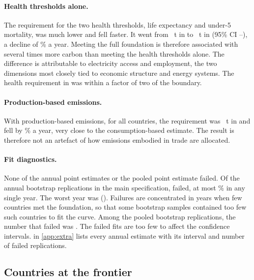 \paragraph{Health thresholds alone.} The requirement for the two health thresholds, life expectancy and under-5 mortality, was much lower and fell faster. It went from \nReqHealthStart~t in \nShareYearStart{} to \nReqHealthEnd~t in \nLastYear{} (95\% CI \nReqHealthEndLo--\nReqHealthEndHi), a decline of \nReqTrendHealth\% a year. Meeting the full foundation is therefore associated with several times more carbon than meeting the health thresholds alone. The difference is attributable to electricity access and employment, the two dimensions most closely tied to economic structure and energy systems. The health requirement in \nLastYear{} was within a factor of two of the boundary.

\paragraph{Production-based emissions.} With production-based emissions, for all \nNCountries{} countries, the requirement was \nReqProdEnd~t in \nLastYear{} and fell by \nReqTrendProd\% a year, very close to the consumption-based estimate. The result is therefore not an artefact of how emissions embodied in trade are allocated.

\paragraph{Fit diagnostics.} None of the \nReqYearsMain{} annual point estimates or the pooled point estimate failed. Of the \nReqBootTotalMain{} annual bootstrap replications in the main specification, \nReqBootFailMain{} failed, at most \nReqBootFailMaxMain\% in any single year. The worst year was \nReqBootFailWorstYear{} (\nReqBootFailWorstReasons). Failures are concentrated in years when few countries met the foundation, so that some bootstrap samples contained too few such countries to fit the curve. Among the \nBootReps{} pooled bootstrap replications, the number that failed was \nPooledBootFailMain. The failed fits are too few to affect the confidence intervals.  in \cref{app:extra} lists every annual estimate with its interval and number of failed replications.

\subsection{Countries at the frontier}\label{sec:res-frontier}

